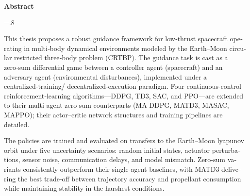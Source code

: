 


\pagestyle{empty}

\begin{latin}
	
	\begin{center}
		\textbf{Abstract}
	\end{center}
	\baselineskip=.8\baselineskip
	\noindent
	
\noindent This thesis proposes a robust guidance framework for low‑thrust spacecraft operating in multi‑body dynamical environments modeled by the Earth–Moon circular restricted three‑body problem (CRTBP). The guidance task is cast as a zero‑sum differential game between a controller agent (spacecraft) and an adversary agent (environmental disturbances), implemented under a centralized‑training/ decentralized‑execution paradigm. Four continuous‑control reinforcement‑learning algorithms—DDPG, TD3, SAC, and PPO—are extended to their multi‑agent zero‑sum counterparts (MA‑DDPG, MATD3, MASAC, MAPPO); their actor–critic network structures and training pipelines are detailed.

The policies are trained and evaluated on transfers to the Earth–Moon  lyapunov orbit under five uncertainty scenarios: random initial states, actuator perturbations, sensor noise, communication delays, and model mismatch. Zero‑sum variants consistently outperform their single‑agent baselines, with MATD3 delivering the best trade‑off between trajectory accuracy and propellant consumption while maintaining stability in the harshest conditions.



\end{latin}

